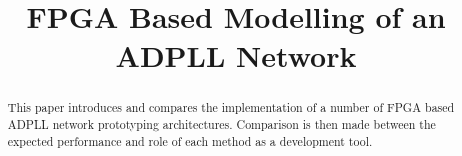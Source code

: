 \documentclass[conference]{IEEEtran}
\begin{document}
\title{FPGA Based Modelling of an ADPLL Network\\}

\author{
}
\maketitle
\begin{abstract}
    This paper introduces and compares the implementation of a number of FPGA based ADPLL network prototyping architectures. Comparison is then made between the expected performance and role of each method as a development tool.
\end{abstract}
\end{document}
